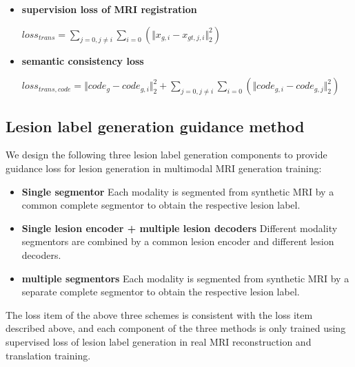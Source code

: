 \documentclass[letterpaper]{article} %
\begin{document}
\begin{itemize}
	\item \textbf{supervision loss of MRI registration}
	\begin{center}
		$loss_{trans}=\sum\limits_{j=0,j\neq i}\sum\limits_{i=0}(\Vert{x_{g,i}-x_{gt,j,i}}\Vert_{2}^{2})$
	\end{center}
	
	\item \textbf{semantic consistency loss}
	\begin{center}
		$loss_{trans,code}=\Vert{code_g-code_{g,i}}\Vert_{2}^{2}+\sum\limits_{j=0,j\neq i}\sum\limits_{i=0}(\Vert{code_{g,i}-code_{g,j}}\Vert_{2}^{2})$
	\end{center}
	
\end{itemize}

\subsection{Lesion label generation guidance method}
\label{label gen methods}
We design the following three lesion label generation components to provide guidance loss for lesion generation in multimodal MRI generation training:
\begin{itemize}
	\item \textbf{Single segmentor} 
	Each modality is segmented from synthetic MRI by a common complete segmentor to obtain the respective lesion label.
	\item \textbf{Single lesion encoder + multiple lesion decoders} 
	Different modality segmentors are combined by a common lesion encoder and different lesion decoders. 
	\item \textbf{multiple segmentors} 
	Each modality is segmented from synthetic MRI by a separate complete segmentor to obtain the respective lesion label.
\end{itemize}
The loss item of the above three schemes is consistent with the loss item described above, and each component of the three methods is only trained using supervised loss of lesion label generation in real MRI reconstruction and translation training.
\end{document}
